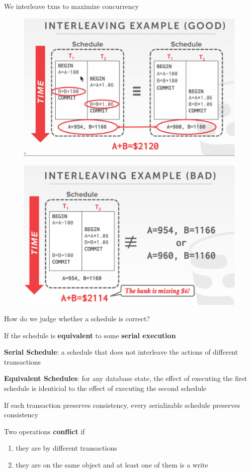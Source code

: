 \documentclass[11pt]{article}
\begin{document}
We interleave txns to maximize concurrency

\begin{figure}[htbp]
\centering
\includegraphics[width=.7\textwidth]{../images/15445/47.png}
\label{}
\end{figure}

\begin{figure}[htbp]
\centering
\includegraphics[width=.7\textwidth]{../images/15445/48.png}
\label{}
\end{figure}

How do we judge whether a schedule is correct?

If the schedule is \textbf{equivalent} to some \textbf{serial execution}

\textbf{Serial Schedule}: a schedule that does not interleave the actions of different transactions

\textbf{Equivalent Schedules}: for any database state, the effect of executing the first schedule is
identicial to the effect of executing the second schedule

If each transaction preserves consistency, every serializable schedule preserves consistency

Two operations \textbf{conflict} if
\begin{enumerate}
\item they are by different transactions
\item they are on the same object and at least one of them is a write
\end{enumerate}
\end{document}
